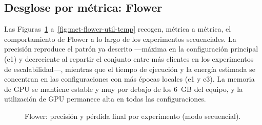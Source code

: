
\subsection{Desglose por métrica: Flower}\label{sec:metricas-flower}

Las Figuras~\ref{fig:met-flower-acc-loss} a~\ref{fig:met-flower-util-temp} recogen, métrica a
métrica, el comportamiento de Flower a lo largo de los experimentos secuenciales. La precisión
reproduce el patrón ya descrito —máxima en la configuración principal (e1) y decreciente al
repartir el conjunto entre más clientes en los experimentos de escalabilidad—, mientras que el
tiempo de ejecución y la energía estimada se concentran en las configuraciones con más épocas
locales (e1 y e3). La memoria de GPU se mantiene estable y muy por debajo de los 6~GB del equipo,
y la utilización de GPU permanece alta en todas las configuraciones.

\begin{figure}[htbp]
  \centering
  \begin{minipage}{0.48\textwidth}
    \centering
  \end{minipage}\hfill
  \begin{minipage}{0.48\textwidth}
    \centering
  \end{minipage}
  \caption{Flower: precisión y pérdida final por experimento (modo secuencial).}
  \label{fig:met-flower-acc-loss}
\end{figure}

